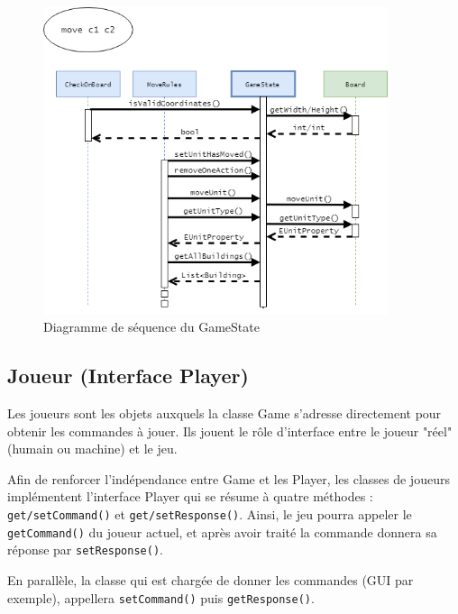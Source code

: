 \documentclass[a4paper]{report}
\begin{document}
\begin{figure}[!h]
\centering
\includegraphics[width=0.9\textwidth]{sequences/sequenceGameState.png}
\caption{Diagramme de séquence du GameState}\label{seq:gamestate}
\end{figure}

\subsection{Joueur (Interface Player)}
Les joueurs sont les objets auxquels la classe Game s'adresse directement pour obtenir les commandes à jouer. Ils jouent le rôle d'interface entre le joueur "réel" (humain ou machine) et le jeu.

Afin de renforcer l'indépendance entre Game et les Player, les classes de joueurs implémentent l'interface Player qui se résume à quatre méthodes : {\tt get/setCommand()} et {\tt get/setResponse()}.
Ainsi, le jeu pourra appeler le {\tt getCommand()} du joueur actuel, et après avoir traité la commande donnera sa réponse par {\tt setResponse()}.

En parallèle, la classe qui est chargée de donner les commandes (GUI par exemple), appellera {\tt setCommand()} puis {\tt getResponse()}.
\end{document}
